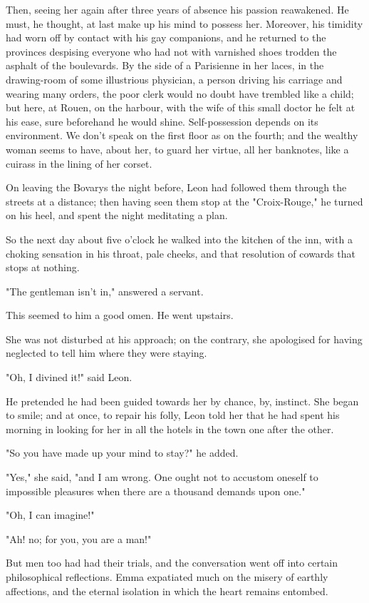 \documentclass{tufte-book}
\begin{document}
Then, seeing her again after three years of absence his passion
reawakened. He must, he thought, at last make up his mind to possess
her. Moreover, his timidity had worn off by contact with his gay
companions, and he returned to the provinces despising everyone who had
not with varnished shoes trodden the asphalt of the boulevards. By
the side of a Parisienne in her laces, in the drawing-room of some
illustrious physician, a person driving his carriage and wearing many
orders, the poor clerk would no doubt have trembled like a child; but
here, at Rouen, on the harbour, with the wife of this small doctor
he felt at his ease, sure beforehand he would shine. Self-possession
depends on its environment. We don't speak on the first floor as on the
fourth; and the wealthy woman seems to have, about her, to guard her
virtue, all her banknotes, like a cuirass in the lining of her corset.

On leaving the Bovarys the night before, Leon had followed them
through the streets at a distance; then having seen them stop at the
"Croix-Rouge," he turned on his heel, and spent the night meditating a
plan.

So the next day about five o'clock he walked into the kitchen of the
inn, with a choking sensation in his throat, pale cheeks, and that
resolution of cowards that stops at nothing.

"The gentleman isn't in," answered a servant.

This seemed to him a good omen. He went upstairs.

She was not disturbed at his approach; on the contrary, she apologised
for having neglected to tell him where they were staying.

"Oh, I divined it!" said Leon.

He pretended he had been guided towards her by chance, by, instinct. She
began to smile; and at once, to repair his folly, Leon told her that he
had spent his morning in looking for her in all the hotels in the town
one after the other.

"So you have made up your mind to stay?" he added.

"Yes," she said, "and I am wrong. One ought not to accustom oneself to
impossible pleasures when there are a thousand demands upon one."

"Oh, I can imagine!"

"Ah! no; for you, you are a man!"

But men too had had their trials, and the conversation went off into
certain philosophical reflections. Emma expatiated much on the misery of
earthly affections, and the eternal isolation in which the heart remains
entombed.
\end{document}
